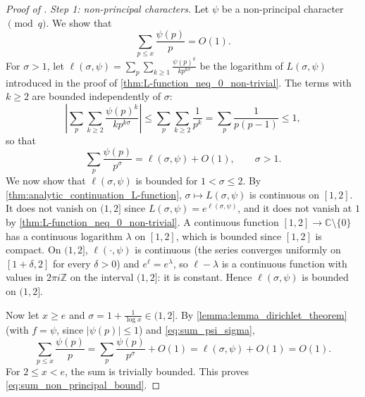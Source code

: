 \begin{proof}[Proof of ]
    \emph{Step 1: non-principal characters.} Let $\psi$ be a non-principal character $\pmod q$. We show that
    \begin{equation}\label{eq:sum_non_principal_bound}
        \sum_{p\le x}\frac{\psi(p)}{p} = O(1).
    \end{equation}
    For $\sigma>1$, let $\ell(\sigma,\psi) = \sum_p\sum_{k\ge 1}\frac{\psi(p)^k}{kp^{k\sigma}}$ be the logarithm of $L(\sigma,\psi)$ introduced in the proof of \cref{thm:L-function_neq_0_non-trivial}. The terms with $k\ge2$ are bounded independently of $\sigma$:
    \begin{equation*}
        \left\lvert\sum_p\sum_{k\ge2}\frac{\psi(p)^k}{kp^{k\sigma}}\right\rvert\le\sum_p\sum_{k\ge2}\frac{1}{p^k} = \sum_p\frac{1}{p(p-1)}\le 1,
    \end{equation*}
    so that
    \begin{equation}\label{eq:sum_psi_sigma}
        \sum_p\frac{\psi(p)}{p^\sigma} = \ell(\sigma,\psi) + O(1), \qquad \sigma>1.
    \end{equation}
    We now show that $\ell(\sigma,\psi)$ is bounded for $1<\sigma\le2$. By \cref{thm:analytic_continuation_L-function}, $\sigma\mapsto L(\sigma,\psi)$ is continuous on $[1,2]$. It does not vanish on $(1,2]$ since $L(\sigma,\psi) = e^{\ell(\sigma,\psi)}$, and it does not vanish at $1$ by \cref{thm:L-function_neq_0_non-trivial}. A continuous function $[1,2]\to\mathbb{C}\setminus\{0\}$ has a continuous logarithm $\lambda$ on $[1,2]$, which is bounded since $[1,2]$ is compact. On $(1,2]$, $\ell(\cdot,\psi)$ is continuous (the series converges uniformly on $[1+\delta,2]$ for every $\delta>0$) and $e^{\ell} = e^{\lambda}$, so $\ell-\lambda$ is a continuous function with values in $2\pi i\mathbb{Z}$ on the interval $(1,2]$: it is constant. Hence $\ell(\sigma,\psi)$ is bounded on $(1,2]$.

    Now let $x\ge e$ and $\sigma = 1 + \frac{1}{\log x}\in(1,2]$. By \cref{lemma:lemma_dirichlet_theorem} (with $f = \psi$, since $\lvert\psi(p)\rvert \le 1$) and \cref{eq:sum_psi_sigma},
    \begin{equation*}
        \sum_{p\le x}\frac{\psi(p)}{p} = \sum_p\frac{\psi(p)}{p^\sigma} + O(1) = \ell(\sigma,\psi) + O(1) = O(1).
    \end{equation*}
    For $2\le x<e$, the sum is trivially bounded. This proves \cref{eq:sum_non_principal_bound}.


\end{proof}
